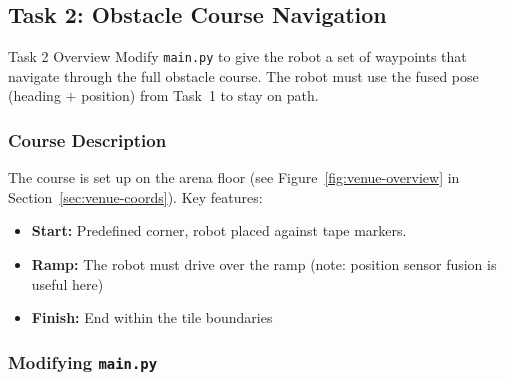 \documentclass[12pt,letterpaper]{article}
\begin{document}

\subsection{Task 2: Obstacle Course Navigation}

\begin{taskbox}{Task 2 Overview}
  Modify \texttt{main.py} to give the robot a set of waypoints that navigate
  through the full obstacle course. The robot must use the fused pose
  (heading $+$ position) from Task~1 to stay on path.
\end{taskbox}

\subsubsection{Course Description}

The course is set up on the arena floor (see Figure~\ref{fig:venue-overview}
in Section~\ref{sec:venue-coords}). Key features:
\begin{itemize}
  \item \textbf{Start:} Predefined corner, robot placed against tape markers.
  \item \textbf{Ramp:} The robot must drive over the ramp (note: position sensor fusion is useful here)
  \item \textbf{Finish:} End within the tile boundaries
\end{itemize}

\subsubsection{Modifying \texttt{main.py}}
\end{document}
